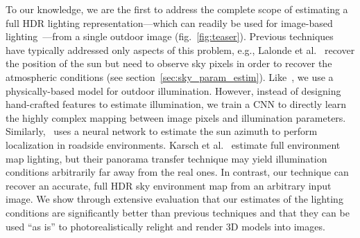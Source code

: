 To our knowledge, we are the first to address the complete scope of estimating a full HDR lighting representation---which can readily be used for image-based lighting~\cite{Debevec1998}---from a single outdoor image (fig.~\ref{fig:teaser}). Previous techniques have typically addressed only aspects of this problem, e.g., Lalonde et al.~\cite{lalonde-ijcv-12} recover the position of the sun but need to observe sky pixels in order to recover the atmospheric conditions (see section~\ref{sec:sky_param_estim}). Like~\cite{lalonde-ijcv-10}, we use a physically-based model for outdoor illumination. However, instead of designing hand-crafted features to estimate illumination, we train a CNN to directly learn the highly complex mapping between image pixels and illumination parameters. Similarly,~\cite{Ma2017} uses a neural network to estimate the sun azimuth to perform localization in roadside environments. Karsch et al.~\cite{karsch2014automatic} estimate full environment map lighting, but their panorama transfer technique may yield illumination conditions arbitrarily far away from the real ones. In contrast, our technique can recover an accurate, full HDR sky environment map from an arbitrary input image. We show through extensive evaluation that our estimates of the lighting conditions are significantly better than previous techniques and that they can be used ``as is'' to photorealistically relight and render 3D models into images.    



